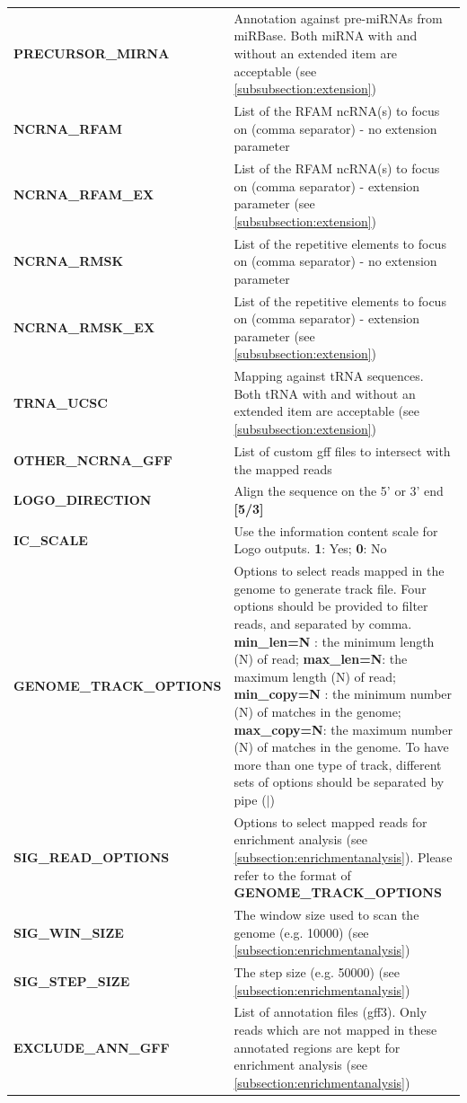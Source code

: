 \documentclass[12pt]{article}
\begin{document}
\begin{center}
\begin{longtable}{|p{8cm}|p{8cm}|}
\textbf{PRECURSOR\_MIRNA} & Annotation against pre-miRNAs from miRBase. Both miRNA with and without an extended item are acceptable (see \ref{subsubsection:extension})\\
\textbf{NCRNA\_RFAM} & List of the RFAM ncRNA(s) to focus on (comma separator) - no extension parameter\\
\textbf{NCRNA\_RFAM\_EX} & List of the RFAM ncRNA(s) to focus on (comma separator) - extension parameter (see \ref{subsubsection:extension})\\
\textbf{NCRNA\_RMSK} & List of the repetitive elements to focus on (comma separator) - no extension parameter \\
\textbf{NCRNA\_RMSK\_EX} &  List of the repetitive elements to focus on (comma separator) -  extension parameter (see \ref{subsubsection:extension})\\
\textbf{TRNA\_UCSC} & Mapping against tRNA sequences. Both tRNA with and without an extended item are acceptable (see \ref{subsubsection:extension})\\
\textbf{OTHER\_NCRNA\_GFF} & List of custom gff files to intersect with the mapped reads\\
\textbf{LOGO\_DIRECTION} &  Align the sequence on the 5' or 3' end \textbf{[5/3]}\\
\textbf{IC\_SCALE} & Use the information content scale for Logo outputs. \textbf{1}: Yes; \textbf{0}: No\\
\textbf{GENOME\_TRACK\_OPTIONS} & Options to select reads mapped in the genome to generate track file. Four options should be provided to filter reads, and separated by comma. \textbf{min\_len=N} : the minimum length (N) of read; \textbf{max\_len=N}: the maximum length (N) of read; \textbf{min\_copy=N} : the minimum number (N) of matches in the genome; \textbf{max\_copy=N}: the maximum number (N) of matches in the genome. To have more than one type of track, different sets of options should be separated by pipe ($|$)\\
\textbf{SIG\_READ\_OPTIONS} & Options to select mapped reads for enrichment analysis (see \ref{subsection:enrichmentanalysis}). Please refer to the format of \textbf{GENOME\_TRACK\_OPTIONS}\\
\textbf{SIG\_WIN\_SIZE} & The window size used to scan the genome (e.g. 10000) (see \ref{subsection:enrichmentanalysis})\\
\textbf{SIG\_STEP\_SIZE} & The step size (e.g. 50000) (see \ref{subsection:enrichmentanalysis})\\
\textbf{EXCLUDE\_ANN\_GFF} & List of annotation files (gff3). Only reads which are not mapped in these annotated regions are kept for enrichment analysis (see \ref{subsection:enrichmentanalysis})\\

\end{longtable}
\end{center}
\end{document}
